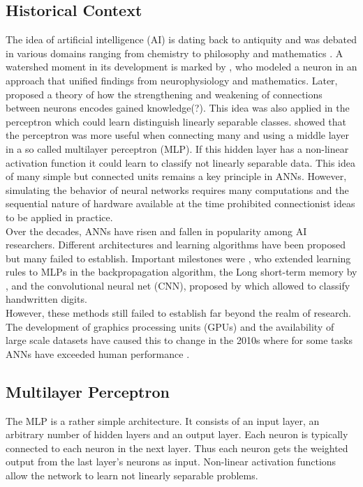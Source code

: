 \documentclass[a4paper,cleardoubleempty,BCOR1cm, 11pt]{report}
\begin{document}
\subsection{Historical Context}
The idea of artificial intelligence (AI) is dating back to antiquity and was debated in various domains ranging from chemistry \cite{o1994alchemical} to philosophy and mathematics \cite{leibnizdissertatio}. A watershed moment in its development is marked by \citet{mcculloch1943logical}, who modeled a neuron in an approach that unified findings from neurophysiology and mathematics. Later, \citet{hebb19680} proposed a theory of how the strengthening and weakening of connections between neurons encodes gained knowledge(?).  This idea was also applied in the perceptron \cite{rosenblatt1960perceptron} which could learn distinguish linearly separable classes. 
\citet{marvin1969perceptrons} showed that the perceptron was more useful when connecting many and using a middle layer in a so called multilayer perceptron (MLP). If this hidden layer has a non-linear activation function it could learn to classify not linearly separable data. This idea of many simple but connected units remains a key principle in ANNs.
However, simulating the behavior of neural networks requires many computations and the sequential nature of hardware available at the time prohibited connectionist ideas to be applied in practice.\\
Over the decades, ANNs have risen and fallen in popularity among AI researchers. Different architectures and learning algorithms have been proposed but many failed to establish. Important milestones were \citet{rumelhart1986learning}, who extended learning rules to MLPs in the backpropagation algorithm, the Long short-term memory by \citet{hochreiter1997long}, and the convolutional neural net (CNN), proposed by \citet{lecun1995convolutional} which allowed to classify handwritten digits.\\
However, these methods still failed to establish far beyond the realm of research. The development of graphics processing units (GPUs) and the availability of large scale datasets have caused this to change in the 2010s where for some tasks ANNs have exceeded human performance \cite{ILSVRC15}.


\subsection{Multilayer Perceptron}\label{sec:MLP}
The MLP is a rather simple architecture. It consists of an input layer, an arbitrary number of hidden layers and an output layer. Each neuron is typically connected to each neuron in the next layer. Thus each neuron gets the weighted output from the last layer's neurons as input. Non-linear activation functions allow the network to learn not linearly separable problems. 
\end{document}
